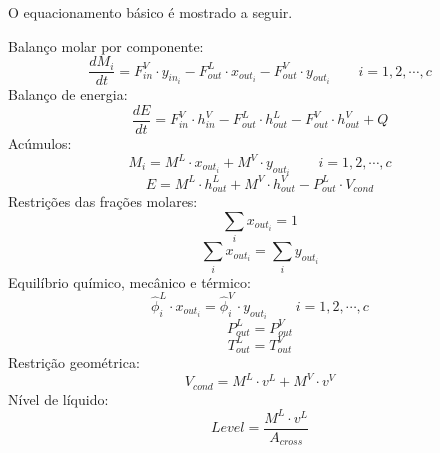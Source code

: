 O equacionamento básico é mostrado a seguir.

Balanço molar por componente:
\begin{equation}
\dfrac{dM_i}{dt} = F_{in}^V \cdot y_{in_i} - F_{out}^L  \cdot x_{out_i} - F_{out}^V \cdot y_{out_i}  \qquad i=1,2,\cdots,c
\end{equation}
Balanço de energia:
\begin{equation}
\dfrac{dE}{dt} = F_{in}^V \cdot h_{in}^V - F_{out}^L  \cdot h_{out}^L - F_{out}^V \cdot h_{out}^V + Q
\end{equation}
Acúmulos:
\begin{equation}
M_i = M^L \cdot x_{out_i} + M^V \cdot y_{out_i}  \qquad i=1,2,\cdots,c
\end{equation}
\begin{equation}
E = M^L \cdot h_{out}^L + M^V \cdot h_{out}^V - P_{out}^L \cdot V_{cond}
\end{equation}
Restrições das frações molares:
\begin{equation}
\sum_i x_{out_i} = 1
\end{equation}
\begin{equation}
\sum_i x_{out_i} = \sum_i y_{out_i}
\end{equation}
Equilíbrio químico, mecânico e térmico:
\begin{equation}
\hat{\phi}_i^L \cdot x_{out_i} = \hat{\phi}_i^V \cdot y_{out_i}  \qquad i=1,2,\cdots,c
\end{equation}
\begin{equation}
P_{out}^L = P_{out}^V
\end{equation}
\begin{equation}
T_{out}^L = T_{out}^V
\end{equation}
Restrição geométrica:
\begin{equation}
V_{cond} = M^L \cdot v^L + M^V \cdot v^V
\end{equation}
Nível de líquido:
\begin{equation}
Level = \dfrac {M^L \cdot v^L}{A_{cross}}
\end{equation}


